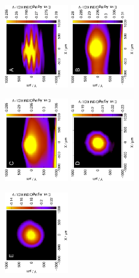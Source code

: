 \newpage
\begin{figure}[H]
\centering
\includegraphics[trim = 10mm 30mm 0mm 10mm, clip, width=0.25\textwidth, angle=-90]{img/polar/meander.eps} \includegraphics[trim = 10mm 30mm 0mm 10mm, clip, width=0.25\textwidth, angle=-90]{img/polar/fastcomb.eps}

\includegraphics[trim = 10mm 30mm 0mm 10mm, clip, width=0.25\textwidth, angle=-90]{img/polar/comb.eps} \includegraphics[trim = 10mm 30mm 0mm 10mm, clip, width=0.25\textwidth, angle=-90]{img/polar/web.eps}

\includegraphics[trim = 10mm 30mm 0mm 10mm, clip, width=0.25\textwidth, angle=-90]{img/polar/arc.eps}


\end{figure}
